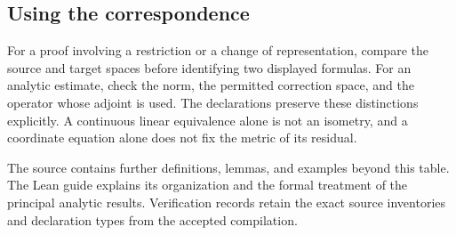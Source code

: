 

\subsection{Using the correspondence}
For a proof involving a restriction or a change of representation, compare the source and target spaces before identifying two displayed formulas. For an analytic estimate, check the norm, the permitted correction space, and the operator whose adjoint is used. The declarations preserve these distinctions explicitly. A continuous linear equivalence alone is not an isometry, and a coordinate equation alone does not fix the metric of its residual.

The source contains further definitions, lemmas, and examples beyond this table. The Lean guide explains its organization and the formal treatment of the principal analytic results. Verification records retain the exact source inventories and declaration types from the accepted compilation.
